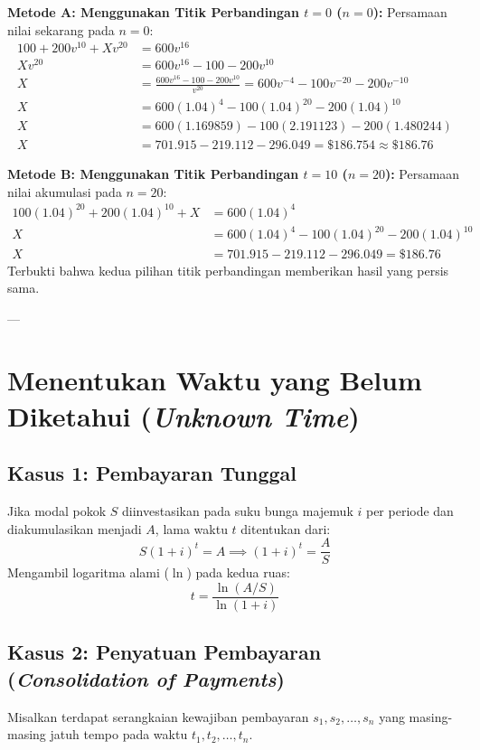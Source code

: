 \documentclass[11pt,a4paper]{article}
\begin{document}
\begin{examplebox}
\textbf{Metode A: Menggunakan Titik Perbandingan $t = 0$ ($n = 0$):}
Persamaan nilai sekarang pada $n = 0$:
\begin{align*}
    100 + 200 v^{10} + X v^{20} &= 600 v^{16} \\[0.4em]
    X v^{20} &= 600 v^{16} - 100 - 200 v^{10} \\[0.4em]
    X &= \frac{600 v^{16} - 100 - 200 v^{10}}{v^{20}} = 600 v^{-4} - 100 v^{-20} - 200 v^{-10} \\[0.4em]
    X &= 600 (1.04)^4 - 100 (1.04)^{20} - 200 (1.04)^{10} \\[0.4em]
    X &= 600(1.169859) - 100(2.191123) - 200(1.480244) \\[0.4em]
    X &= 701.915 - 219.112 - 296.049 = \$186.754 \approx \$186.76
\end{align*}

\textbf{Metode B: Menggunakan Titik Perbandingan $t = 10$ ($n = 20$):}
Persamaan nilai akumulasi pada $n = 20$:
\begin{align*}
    100(1.04)^{20} + 200(1.04)^{10} + X &= 600(1.04)^4 \\[0.4em]
    X &= 600(1.04)^4 - 100(1.04)^{20} - 200(1.04)^{10} \\[0.4em]
    X &= 701.915 - 219.112 - 296.049 = \$186.76
\end{align*}
Terbukti bahwa kedua pilihan titik perbandingan memberikan hasil yang persis sama.
\end{examplebox}

---

\section{Menentukan Waktu yang Belum Diketahui (\textit{Unknown Time})}

\subsection{Kasus 1: Pembayaran Tunggal}
Jika modal pokok $S$ diinvestasikan pada suku bunga majemuk $i$ per periode dan diakumulasikan menjadi $A$, lama waktu $t$ ditentukan dari:
\begin{equation}
    S(1 + i)^t = A \implies (1 + i)^t = \frac{A}{S}
\end{equation}
Mengambil logaritma alami ($\ln$) pada kedua ruas:
\begin{equation}
    t = \frac{\ln(A/S)}{\ln(1 + i)}
\end{equation}

\subsection{Kasus 2: Penyatuan Pembayaran (\textit{Consolidation of Payments})}
Misalkan terdapat serangkaian kewajiban pembayaran $s_1, s_2, \dots, s_n$ yang masing-masing jatuh tempo pada waktu $t_1, t_2, \dots, t_n$. 
\end{document}
